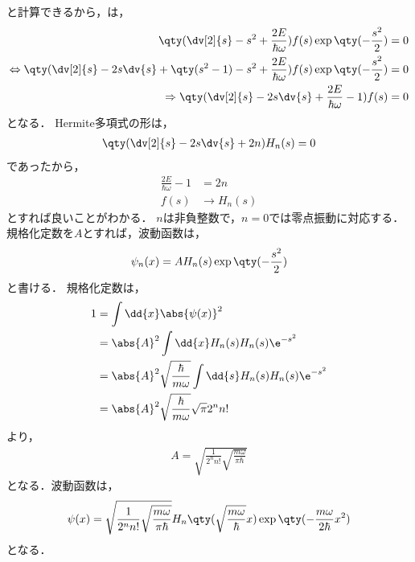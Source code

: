 \documentclass{report}
\begin{document}
      と計算できるから，は，
      \begin{align}
        \qty(\dv[2]{s} - s^2 + \frac{2E}{\hbar\omega})f(s)\exp\qty(-\frac{s^2}{2}) &= 0 \\ 
        \Leftrightarrow \qty(\dv[2]{s} - 2s\dv{s} + \qty(s^2 - 1) - s^2 + \frac{2E}{\hbar\omega})f(s)\exp\qty(-\frac{s^2}{2}) &= 0 \\ 
        \Rightarrow \qty(\dv[2]{s} - 2s\dv{s} + \frac{2E}{\hbar\omega} - 1)f(s) &= 0
      \end{align}
      となる．
      Hermite多項式の形は，
      \begin{align}
        \qty(\dv[2]{s} - 2s\dv{s} + 2n)H_n(s) = 0
      \end{align}
      であったから，
      \begin{align}
        \frac{2E}{\hbar\omega} - 1 &= 2n \\ 
        f(s) &\to H_n(s)
      \end{align}
      とすれば良いことがわかる．
      $n$は非負整数で，$n = 0$では零点振動に対応する．
      規格化定数を$A$とすれば，波動函数は，
      \begin{align}
        \psi_n(x) = AH_n(s)\exp\qty(-\frac{s^2}{2})
      \end{align}
      と書ける．
      規格化定数は，
      \begin{align}
        1 &= \int\dd{x}\abs{\psi(x)}^2 \\ 
        &= \abs{A}^2\int\dd{x}H_n(s)H_n(s)\e^{-s^2} \\ 
        &= \abs{A}^2\sqrt{\frac{\hbar}{m\omega}}\int\dd{s}H_n(s)H_n(s)\e^{-s^2} \\ 
        &= \abs{A}^2\sqrt{\frac{\hbar}{m\omega}}\sqrt{\pi}2^nn! 
      \end{align}
      より，
      \begin{align}
        A = \sqrt{\frac{1}{2^nn!}\sqrt{\frac{m\omega}{\pi\hbar}}}
      \end{align}
      となる．波動函数は，
      \begin{align}
        \psi(x) = \sqrt{\frac{1}{2^nn!}\sqrt{\frac{m\omega}{\pi\hbar}}}H_n\qty(\sqrt{\frac{m\omega}{\hbar}}x)\exp\qty(-\frac{m\omega}{2\hbar}x^2)
      \end{align}
      となる．
\end{document}
